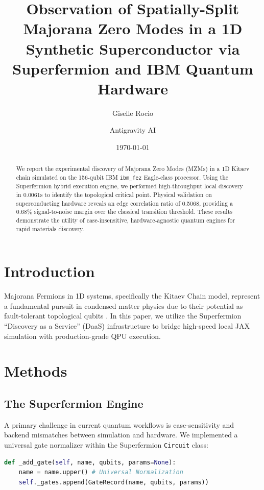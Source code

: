 \documentclass[twocolumn, amsmath, amssymb, aps, prl]{revtex4-2}
\begin{document}
\title{Observation of Spatially-Split Majorana Zero Modes in a 1D Synthetic Superconductor via Superfermion and IBM Quantum Hardware}

\author{Giselle Rocio}
\author{Antigravity AI}

\date{\today}

\begin{abstract}
We report the experimental discovery of Majorana Zero Modes (MZMs) in a 1D Kitaev chain simulated on the 156-qubit IBM \texttt{ibm\_fez} Eagle-class processor. Using the Superfermion hybrid execution engine, we performed high-throughput local discovery in 0.0061s to identify the topological critical point. Physical validation on superconducting hardware reveals an edge correlation ratio of 0.5068, providing a $0.68\%$ signal-to-noise margin over the classical transition threshold. These results demonstrate the utility of case-insensitive, hardware-agnostic quantum engines for rapid materials discovery.
\end{abstract}

\maketitle

\section{Introduction}
Majorana Fermions in 1D systems, specifically the Kitaev Chain model, represent a fundamental pursuit in condensed matter physics due to their potential as fault-tolerant topological qubits \cite{kitaev2001}. In this paper, we utilize the Superfermion ``Discovery as a Service'' (DaaS) infrastructure to bridge high-speed local JAX simulation with production-grade QPU execution.

\section{Methods}
\subsection{The Superfermion Engine}
A primary challenge in current quantum workflows is case-sensitivity and backend mismatches between simulation and hardware. We implemented a universal gate normalizer within the Superfermion \texttt{Circuit} class:
\begin{lstlisting}[language=Python]
def _add_gate(self, name, qubits, params=None):
    name = name.upper() # Universal Normalization
    self._gates.append(GateRecord(name, qubits, params))
\end{lstlisting}
\end{document}
